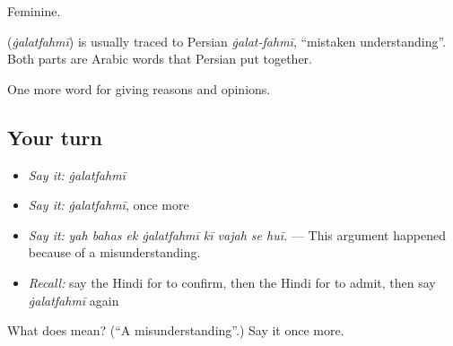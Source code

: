 Feminine.

\begin{cousinweb}
\textbf{} (\emph{ġalatfahmī}) is usually traced to Persian \emph{ġalat-fahmī}, \textquotedblleft{}mistaken understanding\textquotedblright{}. Both parts are Arabic words that Persian put together.
\end{cousinweb}

\begin{grammarlens}[title={What you've built}]
One more word for giving reasons and opinions.
\end{grammarlens}

\subsection*{Your turn}
\begin{itemize}
\raggedright
  \item \emph{Say it:} \emph{ġalatfahmī}
  \item \emph{Say it:} \emph{ġalatfahmī}, once more
  \item \emph{Say it:} \emph{yah bahas ek ġalatfahmī kī vajah se huī.} — This argument happened because of a misunderstanding.
  \item \emph{Recall:} say the Hindi for to confirm, then the Hindi for to admit, then say \emph{ġalatfahmī} again
\end{itemize}

\begin{tcolorbox}[breakable,colback=teal!4,colframe=teal!35!black,title={Before you move on}]
What does  mean? (\textquotedblleft{}A misunderstanding\textquotedblright{}.) Say it once more.
\end{tcolorbox}
